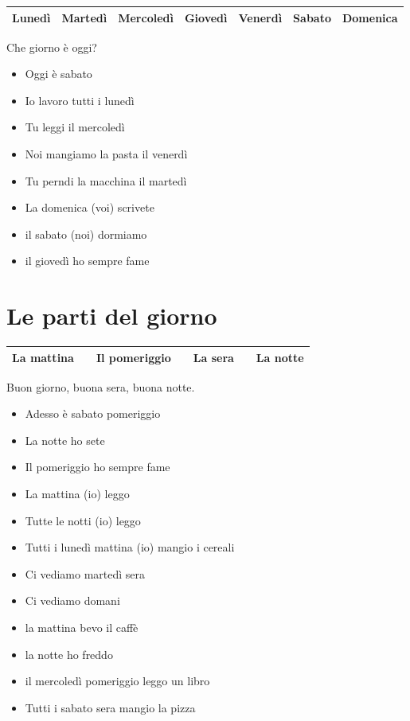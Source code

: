 \documentclass[letter,11pt]{article}
\begin{document}
\begin{tabular}{ |p{2cm}| p{2cm}| p{2cm}| p{2cm}| p{2cm}| p{2cm}| p{2cm}| }

    \hline
    \hline
    Lunedì & Martedì & Mercoledì & Giovedì & Venerdì & Sabato & Domenica\\ \hline
    \hline
\end{tabular}

\vskip 0.2in

Che giorno è oggi?
\begin{multicols}{2}
\begin{itemize}
    \item Oggi è sabato
    \item Io lavoro tutti i lunedì
    \item Tu leggi il mercoledì
    \item Noi mangiamo la pasta il venerdì
    \item Tu perndi la macchina il martedì
    \item La domenica (voi) scrivete
    \item il sabato (noi) dormiamo
    \item il giovedì ho sempre fame
\end{itemize}
\end{multicols}

\vskip 0.2in

\section*{Le parti del giorno}
\vskip 0.2in

\begin{tabular}{ |p{2.5cm}| p{0.5cm}| p{2.5cm}| p{0.5cm}| p{2.5cm}| p{0.5cm}| p{2.5cm}| }

    \hline
    La mattina &  & Il pomeriggio &  & La sera &  & La notte\\ \hline
    \hline
\end{tabular}
\vskip 0.2in
Buon giorno, buona sera, buona notte.
\begin{multicols}{2}
\begin{itemize}
    \item Adesso è sabato pomeriggio
    \item La notte ho sete
    \item Il pomeriggio ho sempre fame
    \item La mattina (io) leggo
    \item Tutte le notti (io) leggo
    \item Tutti i lunedì mattina (io) mangio i cereali

    \item Ci vediamo martedì sera
    \item Ci vediamo domani
    \item la mattina bevo il caffè
    \item la notte ho freddo
    \item il mercoledì pomeriggio leggo un libro
    \item Tutti i sabato sera mangio la pizza
\end{itemize}
\end{multicols}
\end{document}
